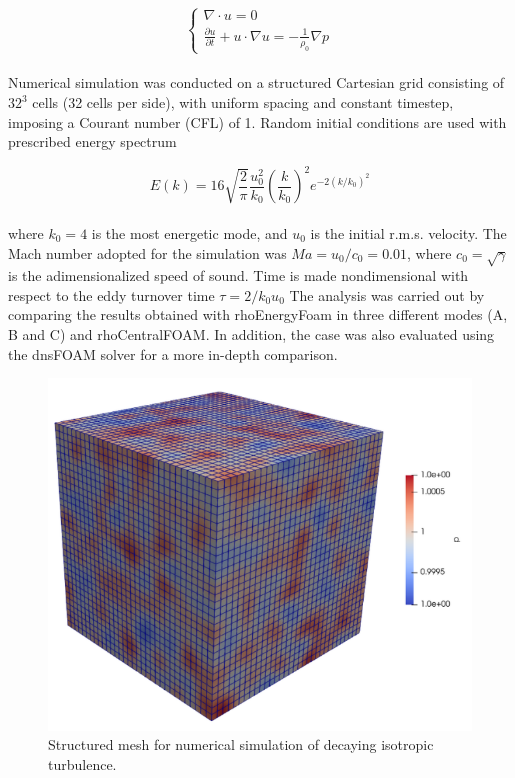 \documentclass[a5paper]{sapthesis}
\begin{document}
	\begin{equation}
		\begin{cases}
			\nabla \cdot u = 0 \\
			\frac{\partial u}{\partial t} + u \cdot \nabla u = - \frac{1}{\rho_0} \nabla p
		\end{cases}
	\end{equation}
	\\
	Numerical simulation was conducted on a structured Cartesian grid consisting of $32^3$ cells (32 cells per side), with uniform spacing and constant timestep, imposing a Courant number (CFL) of 1. Random initial conditions are used with prescribed energy spectrum
	
	\begin{equation}
		E(k) = 16 \sqrt{\frac{2}{\pi}} \frac{u_0^2}{k_0} \left( \frac{k}{k_0} \right )^2 e^{-2(k/k_0)^2}
	\end{equation}
	\\
	where $k_0 = 4$ is the most energetic mode, and $u_0$ is the initial r.m.s. velocity. The Mach number adopted for the simulation was $ Ma= u_0/c_0= 0.01$, where $c_0 = \sqrt{\gamma}$ is the adimensionalized speed of sound. Time is made nondimensional with respect to the eddy turnover time $\tau = 2/k_0 u_0$
	The analysis was carried out by comparing the results obtained with rhoEnergyFoam in three different modes (A, B and C) and rhoCentralFOAM. In addition, the case was also evaluated using the dnsFOAM solver for a more in-depth comparison.
	
	\begin{figure}
		\centering
		\hspace{20mm}
		\includegraphics[width=0.7\linewidth]{Figures/DIT}
		\caption{Structured mesh for numerical simulation of decaying isotropic turbulence.}
		\label{DIT_mesh}
	\end{figure}
	
\end{document}
